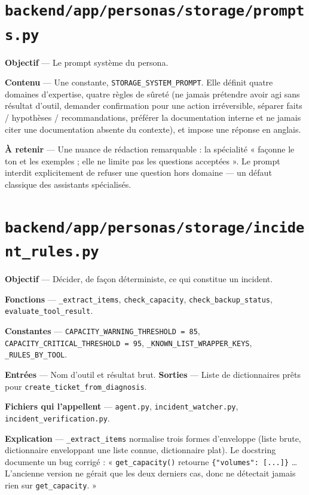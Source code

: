 \documentclass[11pt,a4paper]{report}
\newcommand{\file}[1]{\texttt{\small #1}}
\newcommand{\fn}[1]{\texttt{\small\textcolor{oasisviolet}{#1}}}
\begin{document}
\section{\file{backend/app/personas/storage/prompts.py}}

\textbf{Objectif} --- Le prompt système du persona.

\textbf{Contenu} --- Une constante, \fn{STORAGE\_SYSTEM\_PROMPT}. Elle définit
quatre domaines d'expertise, quatre règles de sûreté (ne jamais prétendre avoir
agi sans résultat d'outil, demander confirmation pour une action irréversible,
séparer faits / hypothèses / recommandations, préférer la documentation interne
et ne jamais citer une documentation absente du contexte), et impose une
réponse en anglais.

\textbf{À retenir} --- Une nuance de rédaction remarquable : la spécialité
« façonne le ton et les exemples ; elle ne limite pas les questions acceptées ».
Le prompt interdit explicitement de refuser une question hors domaine --- un
défaut classique des assistants spécialisés.

\section{\file{backend/app/personas/storage/incident\_rules.py}}

\textbf{Objectif} --- Décider, de façon déterministe, ce qui constitue un
incident.

\textbf{Fonctions} --- \fn{\_extract\_items}, \fn{check\_capacity},
\fn{check\_backup\_status}, \fn{evaluate\_tool\_result}.

\textbf{Constantes} --- \texttt{CAPACITY\_WARNING\_THRESHOLD = 85},
\texttt{CAPACITY\_CRITICAL\_THRESHOLD = 95},
\texttt{\_KNOWN\_LIST\_WRAPPER\_KEYS}, \texttt{\_RULES\_BY\_TOOL}.

\textbf{Entrées} --- Nom d'outil et résultat brut.
\textbf{Sorties} --- Liste de dictionnaires prêts pour
\fn{create\_ticket\_from\_diagnosis}.

\textbf{Fichiers qui l'appellent} --- \file{agent.py},
\file{incident\_watcher.py}, \file{incident\_verification.py}.

\textbf{Explication} --- \fn{\_extract\_items} normalise trois formes
d'enveloppe (liste brute, dictionnaire enveloppant une liste connue,
dictionnaire plat). Le docstring documente un bug corrigé :
« \fn{get\_capacity()} retourne \texttt{\{"volumes": [...]\}} \ldots{}
L'ancienne version ne gérait que les deux derniers cas, donc ne détectait jamais
rien sur \fn{get\_capacity}. »
\end{document}
